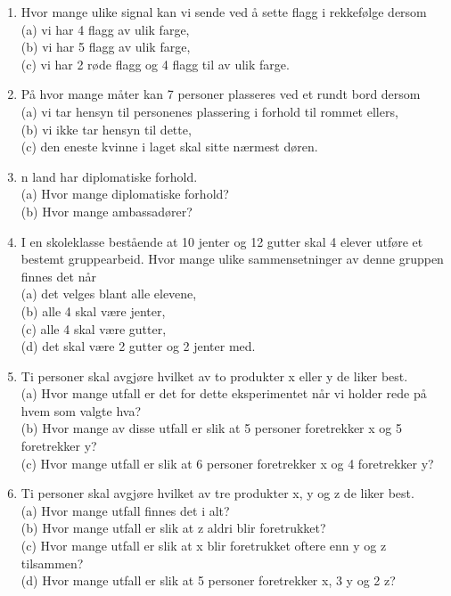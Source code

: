\begin{enumerate}
\item Hvor mange ulike signal kan vi sende ved å sette flagg i
     rekkefølge dersom\\
     (a)  vi har 4 flagg av ulik farge,\\
     (b)  vi har 5 flagg av ulik farge,\\
     (c)  vi har 2 røde flagg og 4 flagg til av ulik farge.

\item På hvor mange måter kan 7 personer plasseres ved et rundt
     bord dersom\\
     (a)  vi tar hensyn til personenes plassering i forhold til  
        rommet ellers,\\
     (b)  vi ikke tar hensyn til dette,\\
     (c)  den eneste kvinne i laget skal sitte nærmest døren.

\item n land har diplomatiske forhold.\\
     (a)  Hvor mange diplomatiske forhold?\\
     (b)  Hvor mange ambassadører?

\item  I en skoleklasse bestående at 10 jenter og 12 gutter skal 4
     elever utføre et bestemt gruppearbeid. Hvor mange ulike
     sammensetninger av denne gruppen finnes det når\\
     (a)  det velges blant alle elevene,\\
     (b)  alle 4 skal være jenter,\\
     (c)  alle 4 skal være gutter,\\
     (d)  det skal være 2 gutter og 2 jenter med.

\item  Ti personer skal avgjøre hvilket av to produkter x eller y
     de liker best.\\
     (a)  Hvor mange utfall er det for dette eksperimentet når vi
          holder rede på hvem som valgte hva?\\
     (b)  Hvor mange av disse utfall er slik at 5 personer     
     foretrekker x og 5 foretrekker y?\\
     (c)  Hvor mange utfall er slik at 6 personer foretrekker x  
        og 4 foretrekker y?

\item  Ti personer skal avgjøre hvilket av tre produkter x, y og z
     de liker best.\\
     (a)  Hvor mange utfall finnes det i alt?\\
     (b)  Hvor mange utfall er slik at z aldri blir foretrukket?\\
     (c)  Hvor mange utfall er slik at x blir foretrukket oftere
          enn y og z tilsammen?\\
     (d)  Hvor mange utfall er slik at 5 personer foretrekker x,
          3 y og 2 z?\\


\end{enumerate}

